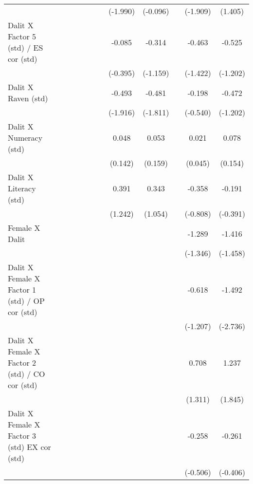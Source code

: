 {\begin{longtable}{@{\extracolsep{\fill}}lccccccccccc}
          &       &       &       &       &       &       & (-1.990) & (-0.096) &       & (-1.909) & (1.405) \\
    Dalit X Factor 5 (std) / ES cor (std) &       &       &       &       &       &       & -0.085 & -0.314 &       & -0.463 & -0.525 \\
          &       &       &       &       &       &       & (-0.395) & (-1.159) &       & (-1.422) & (-1.202) \\
    Dalit X Raven (std) &       &       &       &       &       &       & -0.493 & -0.481 &       & -0.198 & -0.472 \\
          &       &       &       &       &       &       & (-1.916) & (-1.811) &       & (-0.540) & (-1.202) \\
    Dalit X Numeracy (std) &       &       &       &       &       &       & 0.048 & 0.053 &       & 0.021 & 0.078 \\
          &       &       &       &       &       &       & (0.142) & (0.159) &       & (0.045) & (0.154) \\
    Dalit X Literacy (std) &       &       &       &       &       &       & 0.391 & 0.343 &       & -0.358 & -0.191 \\
          &       &       &       &       &       &       & (1.242) & (1.054) &       & (-0.808) & (-0.391) \\
    Female X Dalit &       &       &       &       &       &       &       &       &       & -1.289 & -1.416 \\
          &       &       &       &       &       &       &       &       &       & (-1.346) & (-1.458) \\
    Dalit X Female X Factor 1 (std) / OP cor (std) &       &       &       &       &       &       &       &       &       & -0.618 & -1.492 \\
          &       &       &       &       &       &       &       &       &       & (-1.207) & (-2.736) \\
    Dalit X Female X Factor 2 (std) / CO cor (std) &       &       &       &       &       &       &       &       &       & 0.708 & 1.237 \\
          &       &       &       &       &       &       &       &       &       & (1.311) & (1.845) \\
    Dalit X Female X Factor 3 (std) EX cor (std) &       &       &       &       &       &       &       &       &       & -0.258 & -0.261 \\
          &       &       &       &       &       &       &       &       &       & (-0.506) & (-0.406) \\

\end{longtable}}
